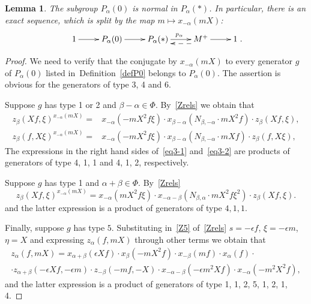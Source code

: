 \documentclass[oneside, 8pt]{amsart}
\newtheorem{lemma}{Lemma}
\theoremstyle{remark}
\theoremstyle{definition}
\numberwithin{equation}{section}
\begin{document}
\begin{lemma}\label{P0_normal} The subgroup $P_\alpha(0)$ is normal in $P_\alpha(*)$. In particular, there is an exact sequence, which is split by the map $m \mapsto x_{-\alpha}(mX)$:
\[\xymatrix{1 \ar[r] & P_\alpha(0) \ar[r] & P_\alpha(*) \ar[r]^{p_\alpha} & M^+ \ar@<5pt>@{-->}[l] \ar[r] & 1}.\] \end{lemma}
\begin{proof} 
We need to verify that the conjugate by $x_{-\alpha}(mX)$ to every generator $g$ of $P_\alpha(0)$ listed in~Definition~\ref{defP0} belongs to $P_\alpha(0)$.
The assertion is obvious for the generators of type 3, 4 and 6.

Suppose $g$ has type 1 or 2 and $\beta - \alpha \in \Phi$. By~\cref{Zrels} we obtain that
\begin{align} z_{\beta}(Xf, \xi) ^ {x_{-\alpha}(mX)} = & x_{-\alpha} (- mX^2f\xi) \cdot x_{\beta-\alpha} (N_{\beta, -\alpha}\cdot mX^2f) \cdot z_{\beta}(Xf, \xi), \label{eq3-1} \\
  z_{\beta}(f, X\xi) ^ {x_{-\alpha}(mX)} = & x_{-\alpha} (- mX^2f\xi ) \cdot x_{\beta-\alpha} (N_{\beta, -\alpha}\cdot mXf) \cdot z_{\beta}(f, X\xi), \nonumber \end{align}
The expressions in the right hand sides of~\eqref{eq3-1} and~\eqref{eq3-2} are products of generators of type 4, 1, 1 and 4, 1, 2, respectively.  

Suppose $g$ has type 1 and  $\alpha + \beta \in \Phi$. By~\cref{Zrels} 
\begin{equation} \label{eq3-2} z_{\beta}(Xf, \xi) ^ {x_{-\alpha}(mX)} = x_{-\alpha} (mX^2f\xi ) \cdot x_{-\alpha-\beta} (N_{\beta,\alpha}\cdot mX^2f\xi^2) \cdot z_{\beta}(Xf, \xi). \end{equation}
and the latter expression is a product of generators of type $4, 1, 1$.

Finally, suppose $g$ has type $5$.
Substituting in~\eqref{Z5} of~\cref{Zrels} $s = -\epsilon f$, $\xi = -\epsilon m$, $\eta=X$ and expressing $z_\alpha(f, mX)$ through other terms we obtain that
\begin{multline} \label{eq:zalpha} z_\alpha(f, mX) = x_{\alpha+\beta}(\epsilon Xf) \cdot x_{\beta}(-mX^2 f) \cdot x_{-\beta}(mf) \cdot x_\alpha(f) \cdot \\ 
 \cdot z_{\alpha+\beta}(-\epsilon X f, -\epsilon m) \cdot z_{-\beta}(-mf, -X) \cdot x_{-\alpha-\beta}(-\epsilon m^2X f) \cdot x_{-\alpha}(-m^2X^2 f), \end{multline}
and the latter expression is a product of generators of type 1, 1, 2, 5, 1, 2, 1, 4.
\end{proof}
\end{document}
